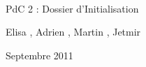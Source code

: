 \documentclass[a4paper]{article}
\begin{document}
\begin{titlepage}
~
\vfill
\begin{center}
\begin{Huge}
PdC 2 : Dossier d'Initialisation\\
\end{Huge}
\vfill
Elisa ,
Adrien ,   
Martin ,
Jetmir 
\vfill
\begin{Large}
Septembre 2011
\end{Large}
\vfill
\end{center}
\vfill
\end{titlepage}

\newpage
\tableofcontents
\newpage


\newpage

\newpage

\newpage

\end{document}

